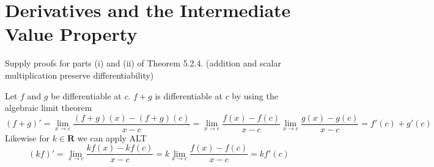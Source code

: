 \section{Derivatives and the Intermediate Value Property}

\begin{exercise}
  Supply proofs for parts (i) and (ii) of Theorem 5.2.4. (addition and scalar multiplication preserve differentiability)
\end{exercise}
\begin{solution}
  Let $f$ and $g$ be differentiable at $c$. $f + g$ is differentiable at $c$ by using the algebraic limit theorem
  $$
  (f + g)' = \lim_{x \to c} \frac{(f + g)(x) - (f + g)(c)}{x-c} = \lim_{x \to c} \frac{f(x) - f(c)}{x - c} \lim_{x \to c} \frac{g(x) - g(c)}{x - c} = f'(c) + g'(c)
  $$
  Likewise for $k \in \mathbf{R}$ we can apply ALT
  $$
  (kf)' = \lim_{x \to c} \frac{kf(x) - kf(c)}{x-c} = k \lim_{x \to c} \frac{f(x)-f(c)}{x-c} = k f'(c)
  $$
\end{solution}


